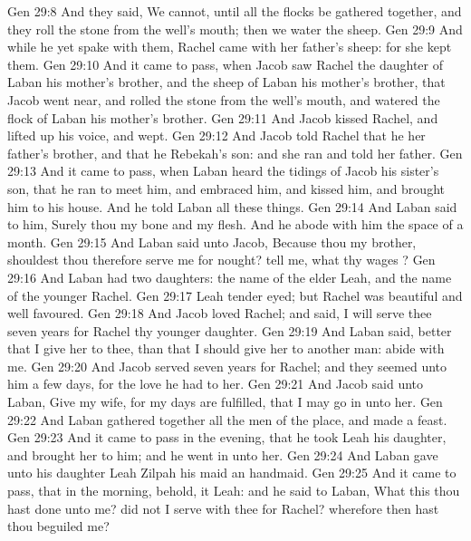 \vs Gen 29:8 And they said, We cannot, until all the flocks be gathered together, and  they roll the stone from the well's mouth; then we water the sheep.
\vs Gen 29:9 And while he yet spake with them, Rachel came with her father's sheep: for she kept them.
\vs Gen 29:10 And it came to pass, when Jacob saw Rachel the daughter of Laban his mother's brother, and the sheep of Laban his mother's brother, that Jacob went near, and rolled the stone from the well's mouth, and watered the flock of Laban his mother's brother.
\vs Gen 29:11 And Jacob kissed Rachel, and lifted up his voice, and wept.
\vs Gen 29:12 And Jacob told Rachel that he  her father's brother, and that he  Rebekah's son: and she ran and told her father.
\vs Gen 29:13 And it came to pass, when Laban heard the tidings of Jacob his sister's son, that he ran to meet him, and embraced him, and kissed him, and brought him to his house. And he told Laban all these things.
\vs Gen 29:14 And Laban said to him, Surely thou  my bone and my flesh. And he abode with him the space of a month.
\vs Gen 29:15 And Laban said unto Jacob, Because thou  my brother, shouldest thou therefore serve me for nought? tell me, what  thy wages ?
\vs Gen 29:16 And Laban had two daughters: the name of the elder  Leah, and the name of the younger  Rachel.
\vs Gen 29:17 Leah  tender eyed; but Rachel was beautiful and well favoured.
\vs Gen 29:18 And Jacob loved Rachel; and said, I will serve thee seven years for Rachel thy younger daughter.
\vs Gen 29:19 And Laban said,  better that I give her to thee, than that I should give her to another man: abide with me.
\vs Gen 29:20 And Jacob served seven years for Rachel; and they seemed unto him  a few days, for the love he had to her.
\vs Gen 29:21 And Jacob said unto Laban, Give  my wife, for my days are fulfilled, that I may go in unto her.
\vs Gen 29:22 And Laban gathered together all the men of the place, and made a feast.
\vs Gen 29:23 And it came to pass in the evening, that he took Leah his daughter, and brought her to him; and he went in unto her.
\vs Gen 29:24 And Laban gave unto his daughter Leah Zilpah his maid  an handmaid.
\vs Gen 29:25 And it came to pass, that in the morning, behold, it  Leah: and he said to Laban, What  this thou hast done unto me? did not I serve with thee for Rachel? wherefore then hast thou beguiled me?
